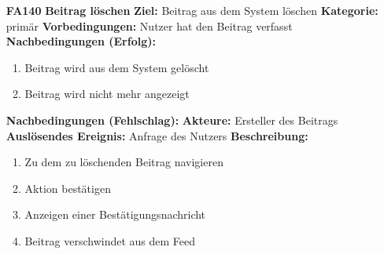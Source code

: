 \documentclass[parskip=full]{scrartcl}
\begin{document}
\begin{itemize}[nosep]
			\item[\textbf{FA140}]\textbf{Beitrag löschen}
			\newline \textbf{Ziel:} Beitrag aus dem System löschen
			\newline \textbf{Kategorie:} primär
			\newline \textbf{Vorbedingungen:} Nutzer hat den Beitrag verfasst
			\newline \textbf{Nachbedingungen (Erfolg):}
			\begin{enumerate}[nosep]
				\item Beitrag wird aus dem System gelöscht
				\item Beitrag wird nicht mehr angezeigt
			\end{enumerate}
			\textbf{Nachbedingungen (Fehlschlag):}
			\newline \textbf{Akteure:} Ersteller des Beitrags
			\newline \textbf{Auslösendes Ereignis:} Anfrage des Nutzers
			\newline \textbf{Beschreibung:}
			\begin{enumerate}[nosep]
				\item Zu dem zu löschenden Beitrag navigieren
				\item Aktion bestätigen
				\item Anzeigen einer Bestätigungsnachricht
				\item Beitrag verschwindet aus dem \gls{Feed}\\
			\end{enumerate}
			

\end{itemize}
\end{document}

